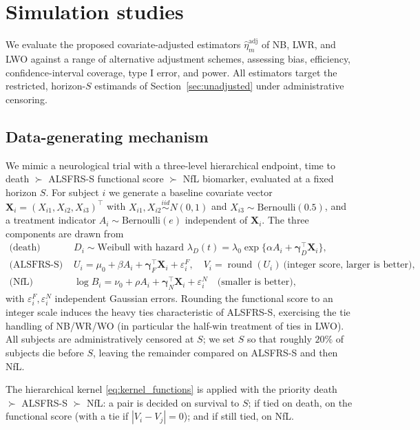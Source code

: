 \documentclass[11pt,a4paper]{article}
\begin{document}
\section{Simulation studies}\label{sec:simulation}

We evaluate the proposed covariate-adjusted estimators $\hat\eta_m^{\mathrm{adj}}$ of NB, LWR, and LWO against a
range of alternative adjustment schemes, assessing bias, efficiency, confidence-interval
coverage, type I error, and power. All estimators target the restricted, horizon-$S$
estimands of Section~\ref{sec:unadjusted} under administrative censoring.

\subsection{Data-generating mechanism}\label{sec:sim_dgm}

We mimic a neurological trial with a three-level hierarchical endpoint, time to death
$\succ$ ALSFRS-S functional score $\succ$ NfL biomarker, evaluated at a fixed horizon $S$.
For subject $i$ we generate a baseline covariate vector
$\mathbf X_i=(X_{i1},X_{i2},X_{i3})^\top$ with $X_{i1},X_{i2}\overset{iid}{\sim}N(0,1)$ and
$X_{i3}\sim\mathrm{Bernoulli}(0.5)$, and a treatment indicator
$A_i\sim\mathrm{Bernoulli}(e)$ independent of $\mathbf X_i$. The three components are drawn
from
\begin{align*}
   \text{(death)}\quad
   & D_i \sim \text{Weibull with hazard } \lambda_D(t)=\lambda_0\exp\{\alpha A_i+\boldsymbol\gamma_D^\top \mathbf X_i\},\\
   \text{(ALSFRS-S)}\quad
   & U_i = \mu_0+\beta A_i+\boldsymbol\gamma_F^\top \mathbf X_i+\varepsilon_i^{F},\quad
     V_i=\operatorname{round}(U_i)\ \text{(integer score, larger is better)},\\
   \text{(NfL)}\quad
   & \log B_i = \nu_0+\rho A_i+\boldsymbol\gamma_N^\top \mathbf X_i+\varepsilon_i^{N}\quad
     \text{(smaller is better)},
\end{align*}
with $\varepsilon_i^{F},\varepsilon_i^{N}$ independent Gaussian errors. Rounding the
functional score to an integer scale induces the heavy ties characteristic of ALSFRS-S,
exercising the tie handling of NB/WR/WO (in particular the half-win treatment of ties in
LWO). All subjects are administratively censored at $S$; we set $S$ so that roughly
$20\%$ of subjects die before $S$, leaving the remainder compared on ALSFRS-S and then NfL.

The hierarchical kernel \eqref{eq:kernel_functions} is applied with the priority
death $\succ$ ALSFRS-S $\succ$ NfL: a pair is decided on survival to $S$; if tied on
death, on the functional score (with a tie if $|V_i-V_j|=0$); and if still tied, on NfL.
\end{document}
